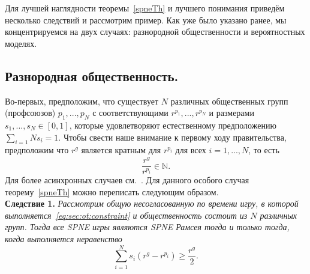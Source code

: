 Для лучшей наглядности теоремы~\ref{spneTh} и лучшего понимания приведём несколько следствий и рассмотрим пример. Как уже было указано ранее, мы концентрируемся на двух случаях: разнородной общественности и вероятностных моделях.

\subsection{Разнородная общественность.} Во-первых, предположим, что существует $N$ различных общественных групп (профсоюзов) $p_1,...,p_N$ с соответствующими $r^{p_1},...,r^{p_N}$ и размерами $s_1,...,s_N \in [0,1]$, которые удовлетворяют естественному предположению $\sum_{i=1}{N}s_i = 1$. Чтобы свести наше внимание к первому ходу правительства, предположим что $r^g$ является кратным для $r^{p_i}$ для всех $i = 1,...,N$, то есть
$$ \frac{r^g}{r^{p_i}} \in \mathbb{N}.$$
Для более асинхронных случаев  см.~\cite{libichIncorpo}. Для данного особого случая теорему~\ref{spneTh} можно переписать следующим образом.\\
\textbf{Следствие 1.} \textit{Рассмотрим общую несогласованную по времени игру, в которой выполняется~\eqref{eq:sec:ot:constraint} и общественность состоит из $N$ различных групп. Тогда все SPNE игры являются SPNE Рамсея тогда и только тогда, когда выполняется неравенство
\begin{equation}
\label{sec:hetero:main4}
\sum_{i=1}^N s_i(r^g - r^{p_i}) \geq \frac{r^g}{2} .
\end{equation}
}

